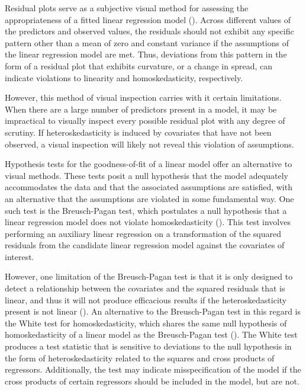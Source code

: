 \documentclass[12pt]{article} %
\theoremstyle{definition}
\begin{document}
		Residual plots serve as a subjective visual method for assessing the appropriateness of a fitted linear regression model (\cite{Miles}). Across different values
		of the predictors and observed values, the residuals should not exhibit any specific pattern other than a mean of zero and constant variance if the assumptions of the linear regression model are met.
		Thus, deviations from this pattern in the form of a residual plot that exhibits curvature, or a change in spread, can indicate violations to linearity and homoskedasticity, respectively. 

		However, this method of visual inspection carries with it certain limitations. When there are a large number of predictors present in a model, it may be impractical to visually inspect every
		possible residual plot with any degree of scrutiny. If heteroskedasticity is induced by covariates that have not been observed, a visual inspection will likely
		not reveal this violation of assumptions.

		Hypothesis tests for the goodness-of-fit of a linear model offer an alternative to visual methods. These tests posit a null hypothesis that the model adequately accommodates the data and that
		the associated assumptions are satisfied, with an alternative that the assumptions are violated in some fundamental way. One such test is the Breusch-Pagan test, which postulates a null hypothesis
		that a linear regression model does not violate homoskedasticity (\cite{Breusch}). This test involves performing an auxiliary linear regression on a transformation of the squared residuals from
		the candidate linear regression model against the covariates of interest.

		However, one limitation of the Breusch-Pagan test is that it is only designed to detect a relationship between the covariates and the squared residuals that is linear, and thus it will not
		produce efficacious results if the heteroskedasticity present is not linear (\cite{Waldman}). An alternative to the Breusch-Pagan test in this regard is the White test for homoskedasticity,
		which shares the same null hypothesis of homoskedasticity of a linear model as the Breusch-Pagan test (\cite{White1980}). The White test produces a test statistic that is sensitive to deviations to
		the null hypothesis in the form of heteroskedasticity related to the squares and cross products of regressors. Additionally, the test may indicate misspecification of the model if the cross products
		of certain regressors should be included in the model, but are not.
\end{document}
